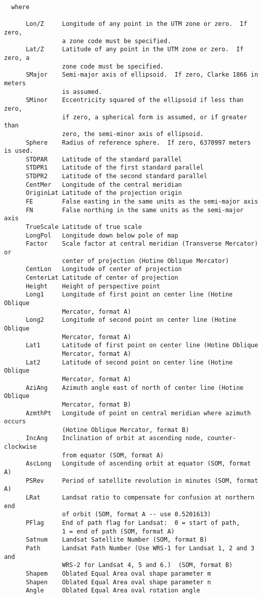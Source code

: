 \begin{verbatim}
  where 

      Lon/Z     Longitude of any point in the UTM zone or zero.  If zero,
                a zone code must be specified.
      Lat/Z     Latitude of any point in the UTM zone or zero.  If zero, a
                zone code must be specified.
      SMajor    Semi-major axis of ellipsoid.  If zero, Clarke 1866 in meters
                is assumed.
      SMinor    Eccentricity squared of the ellipsoid if less than zero,
                if zero, a spherical form is assumed, or if greater than
                zero, the semi-minor axis of ellipsoid.
      Sphere    Radius of reference sphere.  If zero, 6370997 meters is used.
      STDPAR    Latitude of the standard parallel
      STDPR1    Latitude of the first standard parallel
      STDPR2    Latitude of the second standard parallel
      CentMer   Longitude of the central meridian
      OriginLat Latitude of the projection origin
      FE        False easting in the same units as the semi-major axis
      FN        False northing in the same units as the semi-major axis
      TrueScale Latitude of true scale
      LongPol   Longitude down below pole of map
      Factor    Scale factor at central meridian (Transverse Mercator) or
                center of projection (Hotine Oblique Mercator)
      CentLon   Longitude of center of projection
      CenterLat Latitude of center of projection
      Height    Height of perspective point
      Long1     Longitude of first point on center line (Hotine Oblique
                Mercator, format A)
      Long2     Longitude of second point on center line (Hotine Oblique
                Mercator, format A)
      Lat1      Latitude of first point on center line (Hotine Oblique
                Mercator, format A)
      Lat2      Latitude of second point on center line (Hotine Oblique
                Mercator, format A)
      AziAng    Azimuth angle east of north of center line (Hotine Oblique
                Mercator, format B)
      AzmthPt   Longitude of point on central meridian where azimuth occurs
                (Hotine Oblique Mercator, format B)
      IncAng    Inclination of orbit at ascending node, counter-clockwise
                from equator (SOM, format A)
      AscLong   Longitude of ascending orbit at equator (SOM, format A)
      PSRev     Period of satellite revolution in minutes (SOM, format A)
      LRat      Landsat ratio to compensate for confusion at northern end
                of orbit (SOM, format A -- use 0.5201613)
      PFlag     End of path flag for Landsat:  0 = start of path,
                1 = end of path (SOM, format A)
      Satnum    Landsat Satellite Number (SOM, format B)
      Path      Landsat Path Number (Use WRS-1 for Landsat 1, 2 and 3 and
                WRS-2 for Landsat 4, 5 and 6.)  (SOM, format B)
      Shapem    Oblated Equal Area oval shape parameter m
      Shapen    Oblated Equal Area oval shape parameter n
      Angle     Oblated Equal Area oval rotation angle


\end{verbatim}
